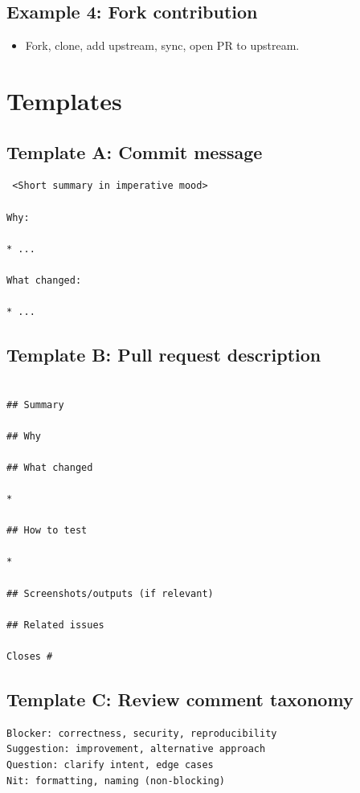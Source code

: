 \subsection{Example 4: Fork contribution}
\begin{itemize}
\item Fork, clone, add upstream, sync, open PR to upstream.
\end{itemize}

\section{Templates}
\subsection{Template A: Commit message}
\begin{verbatim} <Short summary in imperative mood>

Why:

* ...

What changed:

* ...
  \end{verbatim}

\subsection{Template B: Pull request description}
\begin{verbatim}

## Summary

## Why

## What changed

*

## How to test

*

## Screenshots/outputs (if relevant)

## Related issues

Closes #
\end{verbatim}

\subsection{Template C: Review comment taxonomy}
\begin{verbatim}
Blocker: correctness, security, reproducibility
Suggestion: improvement, alternative approach
Question: clarify intent, edge cases
Nit: formatting, naming (non-blocking)
\end{verbatim}


